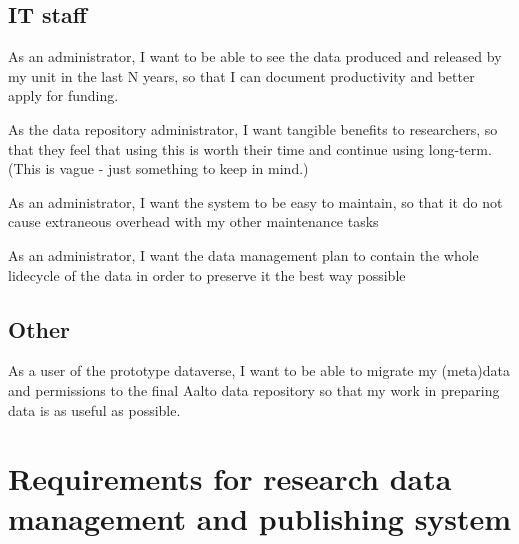 \section{IT staff}

\begin{compactitem}
    \item As an administrator, I want to be able to see the data produced and
          released by my unit in the last N years, so that I can document
          productivity and better apply for funding.
    \item As the data repository administrator, I want tangible benefits to
          researchers, so that they feel that using this is worth their time and
          continue using long-term.  (This is vague - just something to keep in
          mind.)
    \item As an administrator, I want the system to be easy to maintain, so
          that it do not cause extraneous overhead with my other maintenance
          tasks
    \item As an administrator, I want the data management plan to contain the
          whole lidecycle of the data in order to preserve it the best way
          possible
\end{compactitem}

\section{Other}

\begin{compactitem}
    \item As a user of the prototype dataverse, I want to be able to migrate my
          (meta)data and permissions to the final Aalto data repository so that
          my work in preparing data is as useful as possible.
\end{compactitem}




\iffalse
This is the first appendix. You could put some test images or verbose data in an
appendix, if there is too much data to fit in the actual text nicely.

For now, the Aalto logo variants are shown in Figure~\ref{fig:aaltologo}.

\begin{figure}
\begin{center}
 \begin{subfigure}[b]{\textwidth}
  {\selectlanguage{english}\AaltoLogoSmall{1}{!}{aaltoBlue}}
  \caption{In English}
 \end{subfigure}
 \begin{subfigure}[b]{\textwidth}
  {\selectlanguage{finnish}\AaltoLogoSmall{1}{''}{aaltoRed}}
  \caption{Suomeksi}
 \end{subfigure}
 \begin{subfigure}[b]{\textwidth}
  {\selectlanguage{swedish}\AaltoLogoSmall{1}{?}{aaltoYellow}}
  \caption{P\r{a} svenska}
 \end{subfigure}
\caption{Aalto logo variants}
\label{fig:aaltologo}
\end{center}
\end{figure}
\fi

\chapter{Requirements for research data management and publishing system}
\label{chapter:reqs}
